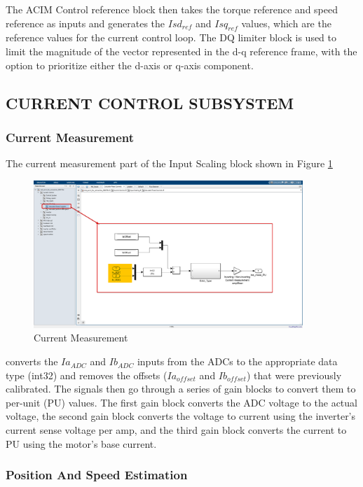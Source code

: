 The ACIM Control reference block then takes the torque reference and speed reference as inputs and generates the $Isd_{ref}$ and $Isq_{ref}$ values, which are the reference values for the current control loop. The DQ limiter block is used to limit the magnitude of the vector represented in the d-q reference frame, with the option to prioritize either the d-axis or q-axis component.


\subsection{CURRENT CONTROL SUBSYSTEM}


\subsubsection{Current Measurement}


The current measurement part of the Input Scaling block shown in Figure \ref{fig:current_measurement}

\begin{figure}[H]
	\centering
	\includegraphics[width=4in]{sections/section3/images/simulation/inputScaling/currentMeasurement.png}
	\caption{Current Measurement}
	\label{fig:current_measurement}
\end{figure}


converts the $Ia_{ADC}$ and $Ib_{ADC}$ inputs from the ADCs to the appropriate data type (int32) and removes the offsets ($Ia_{offset}$ and $Ib_{offset}$) that were previously calibrated. The signals then go through a series of gain blocks to convert them to per-unit (PU) values. The first gain block converts the ADC voltage to the actual voltage, the second gain block converts the voltage to current using the inverter's current sense voltage per amp, and the third gain block converts the current to PU using the motor's base current.


\subsubsection{Position And Speed Estimation}



